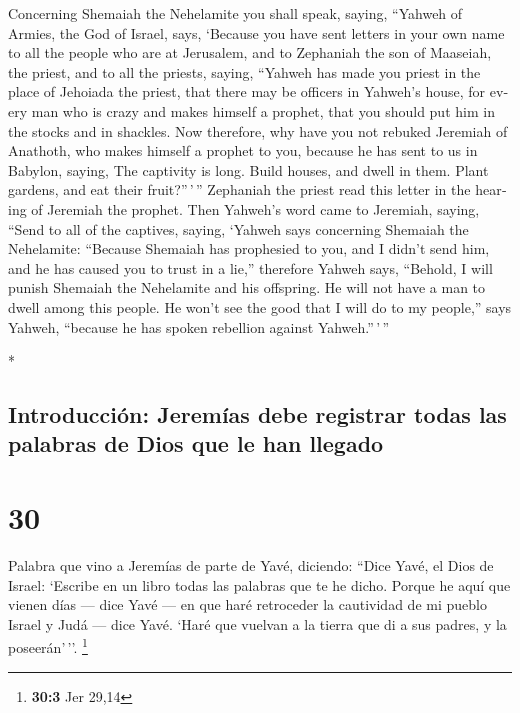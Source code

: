\begin{paracol}{2}
\begin{otherlanguage}{english}
 Concerning Shemaiah the Nehelamite you shall speak,
saying,  ``Yahweh of Armies, the God of Israel, says,
`Because you have sent letters in your own name to all the people who
are at Jerusalem, and to Zephaniah the son of Maaseiah, the priest, and
to all the priests, saying,  ``Yahweh has made you priest
in the place of Jehoiada the priest, that there may be officers in
Yahweh's house, for every man who is crazy and makes himself a prophet,
that you should put him in the stocks and in shackles. 
Now therefore, why have you not rebuked Jeremiah of Anathoth, who makes
himself a prophet to you,  because he has sent to us in
Babylon, saying, The captivity is long. Build houses, and dwell in them.
Plant gardens, and eat their fruit?''\,'\,''  Zephaniah
the priest read this letter in the hearing of Jeremiah the prophet.
 Then Yahweh's word came to Jeremiah, saying,
 ``Send to all of the captives, saying, `Yahweh says
concerning Shemaiah the Nehelamite: ``Because Shemaiah has prophesied to
you, and I didn't send him, and he has caused you to trust in a lie,''
 therefore Yahweh says, ``Behold, I will punish Shemaiah
the Nehelamite and his offspring. He will not have a man to dwell among
this people. He won't see the good that I will do to my people,'' says
Yahweh, ``because he has spoken rebellion against Yahweh.''\,'\,''

\end{otherlanguage}

\switchcolumn[0]*

\hypertarget{introducciuxf3n-jeremuxedas-debe-registrar-todas-las-palabras-de-dios-que-le-han-llegado}{%
\subsection{Introducción: Jeremías debe registrar todas las palabras de
Dios que le han
llegado}\label{introducciuxf3n-jeremuxedas-debe-registrar-todas-las-palabras-de-dios-que-le-han-llegado}}

\hypertarget{section-58}{%
\section{30}\label{section-58}}

 Palabra que vino a Jeremías de parte de Yavé, diciendo:
 ``Dice Yavé, el Dios de Israel: `Escribe en un libro
todas las palabras que te he dicho.  Porque he aquí que
vienen días --- dice Yavé --- en que haré retroceder la cautividad de mi
pueblo Israel y Judá --- dice Yavé. `Haré que vuelvan a la tierra que di
a sus padres, y la poseerán'\,''. \footnote{\textbf{30:3} Jer 29,14}


\end{paracol}
